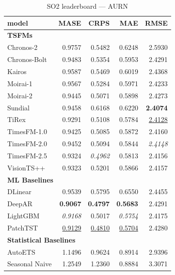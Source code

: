 \begin{table}[H]
\caption{SO2 leaderboard --- AURN}
\centering
\begin{small}
\begin{tabular}{lrrrr}
\toprule
model & MASE & CRPS & MAE & RMSE \\
\midrule
\multicolumn{5}{l}{\textbf{TSFMs}} \\
Chronos-2 & 0.9757 & 0.5482 & 0.6248 & 2.5930 \\
Chronos-Bolt & 0.9483 & 0.5354 & 0.5953 & 2.4291 \\
Kairos & 0.9587 & 0.5469 & 0.6019 & 2.4368 \\
Moirai-1 & 0.9567 & 0.5284 & 0.5971 & 2.4233 \\
Moirai-2 & 0.9445 & 0.5071 & 0.5898 & 2.4273 \\
Sundial & 0.9458 & 0.6168 & 0.6220 & \textbf{2.4074} \\
TiRex & 0.9291 & 0.5108 & 0.5784 & \underline{2.4128} \\
TimesFM-1.0 & 0.9425 & 0.5085 & 0.5872 & 2.4160 \\
TimesFM-2.0 & 0.9452 & 0.5094 & 0.5844 & \textit{2.4148} \\
TimesFM-2.5 & 0.9324 & \textit{0.4962} & 0.5813 & 2.4156 \\
VisionTS++ & 0.9323 & 0.5201 & 0.5866 & 2.4157 \\
\midrule
\multicolumn{5}{l}{\textbf{ML Baselines}} \\
DLinear & 0.9539 & 0.5795 & 0.6550 & 2.4455 \\
DeepAR & \textbf{0.9067} & \textbf{0.4797} & \textbf{0.5683} & 2.4291 \\
LightGBM & \textit{0.9168} & 0.5017 & \textit{0.5754} & 2.4175 \\
PatchTST & \underline{0.9129} & \underline{0.4810} & \underline{0.5704} & 2.4280 \\
\midrule
\multicolumn{5}{l}{\textbf{Statistical Baselines}} \\
AutoETS & 1.1496 & 0.9624 & 0.8914 & 2.9396 \\
Seasonal Naive & 1.2549 & 1.2360 & 0.8884 & 3.3071 \\
\bottomrule
\end{tabular}
\end{small}
\end{table}